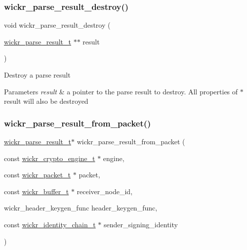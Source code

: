 \subsubsection{\texorpdfstring{wickr\+\_\+parse\+\_\+result\+\_\+destroy()}{wickr\_parse\_result\_destroy()}}
{\footnotesize\ttfamily void wickr\+\_\+parse\+\_\+result\+\_\+destroy (\begin{DoxyParamCaption}\item[{\hyperlink{structwickr__parse__result}{wickr\+\_\+parse\+\_\+result\+\_\+t} $\ast$$\ast$}]{result }\end{DoxyParamCaption})}

Destroy a parse result


\begin{DoxyParams}{Parameters}
{\em result} & a pointer to the parse result to destroy. All properties of \textquotesingle{}$\ast$result\textquotesingle{} will also be destroyed \\
\hline
\end{DoxyParams}
\mbox{\label{group__wickr__protocol_ga1654ef299f9189b27e5e58485f1ffcf5}} 
\subsubsection{\texorpdfstring{wickr\+\_\+parse\+\_\+result\+\_\+from\+\_\+packet()}{wickr\_parse\_result\_from\_packet()}}
{\footnotesize\ttfamily \hyperlink{structwickr__parse__result}{wickr\+\_\+parse\+\_\+result\+\_\+t}$\ast$ wickr\+\_\+parse\+\_\+result\+\_\+from\+\_\+packet (\begin{DoxyParamCaption}\item[{const \hyperlink{structwickr__crypto__engine}{wickr\+\_\+crypto\+\_\+engine\+\_\+t} $\ast$}]{engine,  }\item[{const \hyperlink{structwickr__packet}{wickr\+\_\+packet\+\_\+t} $\ast$}]{packet,  }\item[{const \hyperlink{structwickr__buffer}{wickr\+\_\+buffer\+\_\+t} $\ast$}]{receiver\+\_\+node\+\_\+id,  }\item[{wickr\+\_\+header\+\_\+keygen\+\_\+func}]{header\+\_\+keygen\+\_\+func,  }\item[{const \hyperlink{structwickr__identity__chain}{wickr\+\_\+identity\+\_\+chain\+\_\+t} $\ast$}]{sender\+\_\+signing\+\_\+identity }\end{DoxyParamCaption})}

